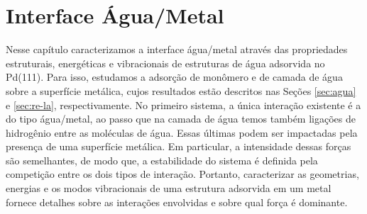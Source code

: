 \chapter{Interface Água/Metal \label{cap:equilibrio}}

Nesse capítulo caracterizamos a interface água/metal através das propriedades estruturais, energéticas e vibracionais de estruturas de água adsorvida no Pd(111). Para isso, estudamos a adsorção de monômero e de camada de água sobre a superfície metálica, cujos resultados estão descritos nas Seções \ref{sec:agua} e \ref{sec:re-la}, respectivamente. No primeiro sistema, a única interação existente é a do tipo água/metal, ao passo que na camada de água temos também ligações de hidrogênio entre as moléculas de água. Essas últimas podem ser impactadas pela presença de uma superfície metálica. Em particular, a intensidade dessas forças são semelhantes, de modo que, a estabilidade do sistema é definida pela competição entre os dois tipos de interação. Portanto, caracterizar as geometrias, energias e os modos vibracionais de uma estrutura adsorvida em um metal fornece detalhes sobre as interações envolvidas e sobre qual força é dominante. 


